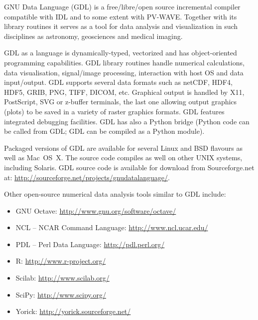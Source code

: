 GNU Data Language (GDL) is a free/libre/open source incremental compiler 
  compatible with IDL and to some extent with PV-WAVE.
Together with its library routines it serves as a tool for data analysis 
  and visualization in such disciplines as astronomy, geosciences and
  medical imaging. 

GDL as a language is dynamically-typed, vectorized and has 
  object-oriented programming capabilities. 
GDL library routines handle numerical calculations, data visualisation, 
  signal/image processing, interaction with host OS and data input/output. 
GDL supports several data formats such as netCDF, HDF4, HDF5, GRIB, PNG, TIFF, 
  DICOM, etc. 
Graphical output is handled by X11, PostScript, SVG or z-buffer terminals, 
  the last one allowing output graphics (plots) to be saved in a variety of 
  raster graphics formats.
GDL features integrated debugging facilities. 
GDL has also a Python bridge (Python code can be called from GDL; GDL can be compiled 
  as a Python module). 

Packaged versions of GDL are available for several Linux and BSD flavours as well as Mac~OS~X. 
The source code compiles as well on other UNIX systems, including Solaris.
GDL source code is available for download from Sourceforge.net at:
\url{http://sourceforge.net/projects/gnudatalanguage/}.

Other open-source numerical data analysis tools similar to GDL include:
\begin{itemize}
  \item{GNU Octave: \url{http://www.gnu.org/software/octave/}}
  \item{NCL -- NCAR Command Language: \url{http://www.ncl.ucar.edu/}}
  \item{PDL -- Perl Data Language: \url{http://pdl.perl.org/}}
  \item{R: \url{http://www.r-project.org/}}
  \item{Scilab: \url{http://www.scilab.org/}}
  \item{SciPy: \url{http://www.scipy.org/}}
  \item{Yorick: \url{http://yorick.sourceforge.net/}}
\end{itemize}
